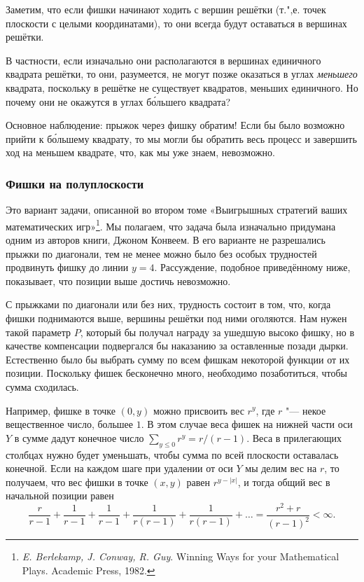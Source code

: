 \documentclass[twoside]{book}
\begin{document}
\medskip

Заметим, что если фишки начинают ходить с вершин решётки (т.",е. точек плоскости с целыми координатами), то они всегда будут оставаться в вершинах решётки.

В частности, если изначально они располагаются в вершинах единичного квадрата решётки, то они, разумеется, не могут позже оказаться в углах \emph{меньшего} квадрата, поскольку в решётке не существует квадратов, меньших единичного.
Но почему они не окажутся в углах б\'{о}льшего квадрата?

Основное наблюдение: прыжок через фишку обратим!
Если бы было возможно прийти к б\'{о}льшему квадрату, то мы могли бы обратить весь процесс и завершить ход на меньшем квадрате, что, как мы уже знаем, невозможно.
\heart

\subsubsection*{Фишки на полуплоскости}%

Это вариант задачи, описанной во втором томе «Выигрышных стратегий ваших математических игр»\footnote{\emph{E. Berlekamp, J. Conway, R. Guy}.
{Winning Ways for your Mathematical Plays.} Academic Press, 1982.}.
Мы полагаем, что задача была изначально придумана одним из авторов книги, Джоном Конвеем.
В его варианте не разрешались прыжки по диагонали, тем не менее можно было без особых трудностей продвинуть фишку до линии $y = 4$.
Рассуждение, подобное приведённому ниже, показывает, что позиции выше достичь невозможно.

\medskip

С прыжками по диагонали или без них, трудность состоит в том, что, когда фишки поднимаются выше, вершины решётки под ними оголяются.
Нам нужен такой параметр $P$, который бы получал награду за ушедшую высоко фишку, но в качестве компенсации подвергался бы наказанию за оставленные позади дырки.
Естественно было бы выбрать сумму по всем фишкам некоторой функции от их позиции.
Поскольку фишек бесконечно много, необходимо позаботиться, чтобы сумма сходилась.

Например, фишке в точке $(0, y)$ можно присвоить вес $r^y$, где $r$ "--- некое вещественное число, большее $1$.
В этом случае веса фишек на нижней части оси $Y$ в сумме дадут конечное число $\sum_{y\le 0}r^y = r/(r-1)$.
Веса в прилегающих столбцах нужно будет уменьшать, чтобы сумма по всей плоскости оставалась конечной.
Если на каждом шаге при удалении от оси $Y$ мы делим вес на $r$, то получаем, что вес фишки в точке $(x, y)$ равен $r^{y - |x|}$, и тогда общий вес в начальной позиции равен
\[\frac r{r-1} + \frac 1{r-1} +\frac 1{r-1} +\frac 1{r(r-1)} +\frac 1{r(r-1)} + \ldots =\frac{r^2+r}{(r-1)^2} <\infty.\]
\end{document}
